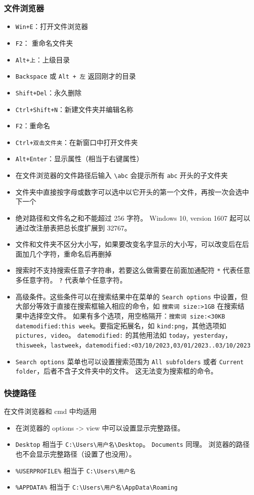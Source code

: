 \subsubsection{文件浏览器}
\begin{itemize}
\item \verb|Win+E|：打开文件浏览器
\item \verb`F2`： 重命名文件夹
\item \verb|Alt+上|：上级目录
\item \verb|Backspace| 或 \verb|Alt + 左| 返回刚才的目录
\item \verb|Shift+Del|：永久删除
\item \verb|Ctrl+Shift+N|：新建文件夹并编辑名称
\item \verb|F2|：重命名
\item \verb|Ctrl+双击文件夹|：在新窗口中打开文件夹
\item \verb`Alt+Enter`：显示属性（相当于右键属性）
\item 在文件浏览器的文件路径后输入 \verb`\abc` 会提示所有 \verb`abc` 开头的子文件夹
\item 文件夹中直接按字母或数字可以选中以它开头的第一个文件，再按一次会选中下一个
\item 绝对路径和文件名之和不能超过 256 字符。 Windows 10, version 1607 起可以通过改注册表把总长度扩展到 32767。
\item 文件和文件夹不区分大小写，如果要改变名字显示的大小写，可以改变后在后面加几个字符，重命名后再删掉
\item 搜索时不支持搜索任意子字符串，若要这么做需要在前面加通配符 \verb`*` 代表任意多任意字符。 \verb`?` 代表单个任意字符。
\item 高级条件。这些条件可以在搜索结果中在菜单的 \verb`Search options` 中设置，但大部分等效于直接在搜索框输入相应的命令，如 \verb`搜索词 size:>1GB` 在搜索结果中选择空文件。 如果有多个选项，用空格隔开：\verb`搜索词 size:<30KB datemodified:this week`。要指定拓展名，如 \verb`kind:png`，其他选项如 \verb`pictures, video`。 \verb`datemodified:` 的其他用法如 \verb`today`，\verb`yesterday`，\verb`thisweek`，\verb`lastweek`，\verb`datemodified:<03/10/2023,03/01/2023..03/10/2023`
\item \verb`Search options` 菜单也可以设置搜索范围为 \verb`All subfolders` 或者 \verb`Current folder`，后者不含子文件夹中的文件。 这无法变为搜索框的命令。
\end{itemize}

\subsubsection{快捷路径}
在文件浏览器和 cmd 中均适用
\begin{itemize}
\item 在浏览器的 options -> view 中可以设置显示完整路径。
\item \verb|Desktop| 相当于 \verb|C:\Users\用户名\Desktop|。 \verb|Documents| 同理。 浏览器的路径也不会显示完整路径（设置了也没用）。
\item \verb|%USERPROFILE%| 相当于 \verb|C:\Users\用户名|
\item \verb|%APPDATA%| 相当于 \verb|C:\Users\用户名\AppData\Roaming|
\end{itemize}

